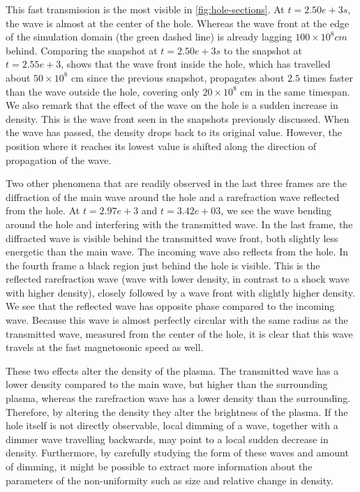 This fast transmission is the most visible in \cref{fig:hole-sections}. 
At $t=2.50e+3 s$, the wave is almost at the center of the hole. Whereas the wave front at the edge of the simulation domain (the green dashed line) is already lagging $100\times10^{8} cm$ behind.
Comparing the snapshot at $t=2.50e+3 s$ to the snapshot at $t=2.55e+3$, shows that the wave front inside the hole, which has travelled about $50\times10^{8}$ cm since the previous snapshot, propagates about $2.5$ times faster than the wave outside the hole, covering only $20\times10^{8}$ cm in the same timespan.
We also remark that the effect of the wave on the hole is a sudden increase in density. This is the wave front seen in the snapshots previously discussed.
When the wave has passed, the density drops back to its original value. However, the position where it reaches its lowest value is shifted along the direction of propagation of the wave.

Two other phenomena that are readily observed in the last three frames are the diffraction of the main wave around the hole and a rarefraction wave reflected from the hole.
At $t=2.97e+3$ and $t=3.42e+03$, we see the wave bending around the hole and interfering with the transmitted wave.
In the last frame, the diffracted wave is visible behind the transmitted wave front, both slightly less energetic than the main wave.
The incoming wave also reflects from the hole.
In the fourth frame a black region just behind the hole is visible. This is the reflected rarefraction wave (wave with lower density, in contrast to a shock wave with higher density), closely followed by a wave front with slightly higher density.
We see that the reflected wave has opposite phase compared to the incoming wave.
Because this wave is almost perfectly circular with the same radius as the transmitted wave, measured from the center of the hole, it is clear that this wave travels at the fast magnetosonic speed as well.

These two effects alter the density of the plasma. The transmitted wave has a lower density compared to the main wave, but higher than the surrounding plasma, whereas the rarefraction wave has a lower density than the surrounding.
Therefore, by altering the density they alter the brightness of the plasma. 
If the hole itself is not directly observable, local dimming of a wave, together with a dimmer wave travelling backwards, may point to a local sudden decrease in density.
Furthermore, by carefully studying the form of these waves and amount of dimming, it might be possible to extract more information about the parameters of the non-uniformity such as size and relative change in density.

